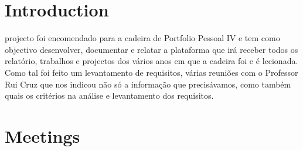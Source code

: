\documentclass[a4paper,12pt,journal,twoside,compsoc]{PPIEEEtran}
\begin{document}

\maketitle

\IEEEdisplaynontitleabstractindextext
\IEEEpeerreviewmaketitle
\section{Introduction}
% 
% 
 projecto foi encomendado para a cadeira de Portfolio Pessoal IV e tem como objectivo desenvolver, documentar e relatar a plataforma que irá receber todos os relatório, trabalhos e projectos dos vários anos em que a cadeira foi e é lecionada. Como tal foi feito um levantamento de requisitos, várias reuniões com o Professor Rui Cruz que nos indicou não só a informação que precisávamos, como também quais os critérios na análise e levantamento dos requisitos.


\section{Meetings}
\end{document}
